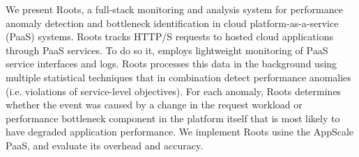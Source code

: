 We present Roots, a full-stack monitoring and analysis system
for performance anomaly detection and bottleneck identification
in cloud platform-as-a-service (PaaS) systems.  Roots tracks 
HTTP/S requests to hosted cloud applications through PaaS services.
To do so it, employs lightweight monitoring of PaaS service interfaces
and logs.  Roots processes this data in the background using multiple
statistical techniques that in combination detect performance
anomalies (i.e. violations of service-level objectives). For each anomaly,
Roots determines whether the event was caused by a change in
the request workload or performance bottleneck component in the platform 
itself that is most likely to have degraded application performance.
We implement Roots usine the AppScale PaaS, and evaluate its overhead
and accuracy.


